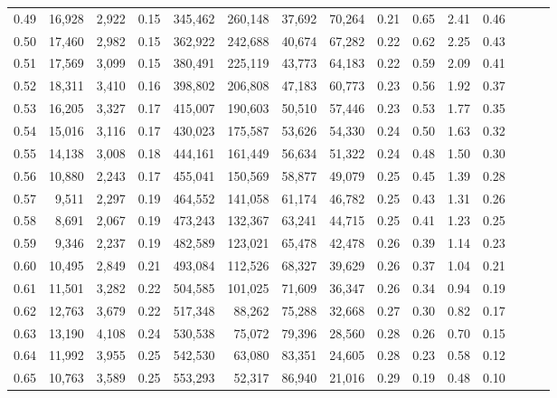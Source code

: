 \begin{tabular}{rrrrrrrrrrrrrrr}
0.49 &  16,928 &  2,922 &  0.15 &  345,462 &  260,148 &   37,692 &   70,264 &  0.21 &  0.65 &  2.41 &      0.46 \\
0.50 &  17,460 &  2,982 &  0.15 &  362,922 &  242,688 &   40,674 &   67,282 &  0.22 &  0.62 &  2.25 &      0.43 \\
0.51 &  17,569 &  3,099 &  0.15 &  380,491 &  225,119 &   43,773 &   64,183 &  0.22 &  0.59 &  2.09 &      0.41 \\
0.52 &  18,311 &  3,410 &  0.16 &  398,802 &  206,808 &   47,183 &   60,773 &  0.23 &  0.56 &  1.92 &      0.37 \\
0.53 &  16,205 &  3,327 &  0.17 &  415,007 &  190,603 &   50,510 &   57,446 &  0.23 &  0.53 &  1.77 &      0.35 \\
0.54 &  15,016 &  3,116 &  0.17 &  430,023 &  175,587 &   53,626 &   54,330 &  0.24 &  0.50 &  1.63 &      0.32 \\
0.55 &  14,138 &  3,008 &  0.18 &  444,161 &  161,449 &   56,634 &   51,322 &  0.24 &  0.48 &  1.50 &      0.30 \\
0.56 &  10,880 &  2,243 &  0.17 &  455,041 &  150,569 &   58,877 &   49,079 &  0.25 &  0.45 &  1.39 &      0.28 \\
0.57 &   9,511 &  2,297 &  0.19 &  464,552 &  141,058 &   61,174 &   46,782 &  0.25 &  0.43 &  1.31 &      0.26 \\
0.58 &   8,691 &  2,067 &  0.19 &  473,243 &  132,367 &   63,241 &   44,715 &  0.25 &  0.41 &  1.23 &      0.25 \\
0.59 &   9,346 &  2,237 &  0.19 &  482,589 &  123,021 &   65,478 &   42,478 &  0.26 &  0.39 &  1.14 &      0.23 \\
0.60 &  10,495 &  2,849 &  0.21 &  493,084 &  112,526 &   68,327 &   39,629 &  0.26 &  0.37 &  1.04 &      0.21 \\
0.61 &  11,501 &  3,282 &  0.22 &  504,585 &  101,025 &   71,609 &   36,347 &  0.26 &  0.34 &  0.94 &      0.19 \\
0.62 &  12,763 &  3,679 &  0.22 &  517,348 &   88,262 &   75,288 &   32,668 &  0.27 &  0.30 &  0.82 &      0.17 \\
0.63 &  13,190 &  4,108 &  0.24 &  530,538 &   75,072 &   79,396 &   28,560 &  0.28 &  0.26 &  0.70 &      0.15 \\
0.64 &  11,992 &  3,955 &  0.25 &  542,530 &   63,080 &   83,351 &   24,605 &  0.28 &  0.23 &  0.58 &      0.12 \\
0.65 &  10,763 &  3,589 &  0.25 &  553,293 &   52,317 &   86,940 &   21,016 &  0.29 &  0.19 &  0.48 &      0.10 \\

\end{tabular}
